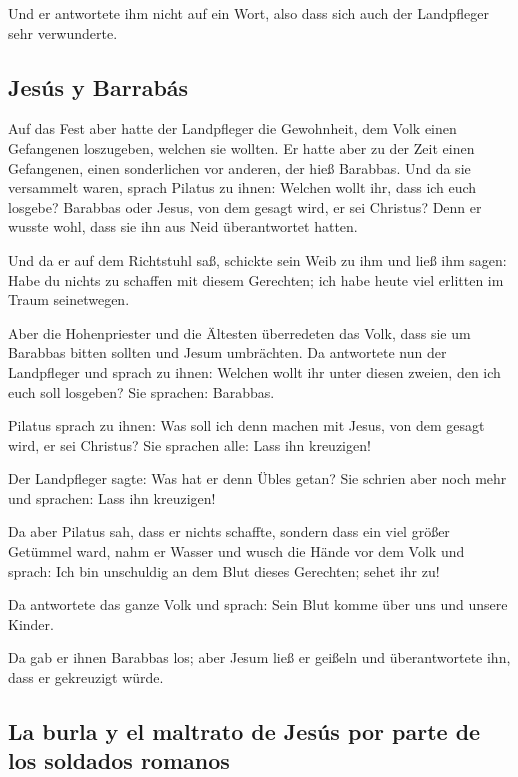  Und er antwortete ihm nicht auf ein Wort, also dass sich
auch der Landpfleger sehr verwunderte.

\hypertarget{jesuxfas-y-barrabuxe1s}{%
\subsection{Jesús y Barrabás}\label{jesuxfas-y-barrabuxe1s}}

 Auf das Fest aber hatte der Landpfleger die Gewohnheit,
dem Volk einen Gefangenen loszugeben, welchen sie wollten.
 Er hatte aber zu der Zeit einen Gefangenen, einen
sonderlichen vor anderen, der hieß Barabbas.  Und da sie
versammelt waren, sprach Pilatus zu ihnen: Welchen wollt ihr, dass ich
euch losgebe? Barabbas oder Jesus, von dem gesagt wird, er sei Christus?
 Denn er wusste wohl, dass sie ihn aus Neid überantwortet
hatten.

 Und da er auf dem Richtstuhl saß, schickte sein Weib zu
ihm und ließ ihm sagen: Habe du nichts zu schaffen mit diesem Gerechten;
ich habe heute viel erlitten im Traum seinetwegen.

 Aber die Hohenpriester und die Ältesten überredeten das
Volk, dass sie um Barabbas bitten sollten und Jesum umbrächten.
 Da antwortete nun der Landpfleger und sprach zu ihnen:
Welchen wollt ihr unter diesen zweien, den ich euch soll losgeben? Sie
sprachen: Barabbas.

 Pilatus sprach zu ihnen: Was soll ich denn machen mit
Jesus, von dem gesagt wird, er sei Christus? Sie sprachen alle: Lass ihn
kreuzigen!

 Der Landpfleger sagte: Was hat er denn Übles getan? Sie
schrien aber noch mehr und sprachen: Lass ihn kreuzigen!

 Da aber Pilatus sah, dass er nichts schaffte, sondern
dass ein viel größer Getümmel ward, nahm er Wasser und wusch die Hände
vor dem Volk und sprach: Ich bin unschuldig an dem Blut dieses
Gerechten; sehet ihr zu!

 Da antwortete das ganze Volk und sprach: Sein Blut komme
über uns und unsere Kinder.

 Da gab er ihnen Barabbas los; aber Jesum ließ er geißeln
und überantwortete ihn, dass er gekreuzigt würde.

\hypertarget{la-burla-y-el-maltrato-de-jesuxfas-por-parte-de-los-soldados-romanos}{%
\subsection{La burla y el maltrato de Jesús por parte de los soldados
romanos}\label{la-burla-y-el-maltrato-de-jesuxfas-por-parte-de-los-soldados-romanos}}

